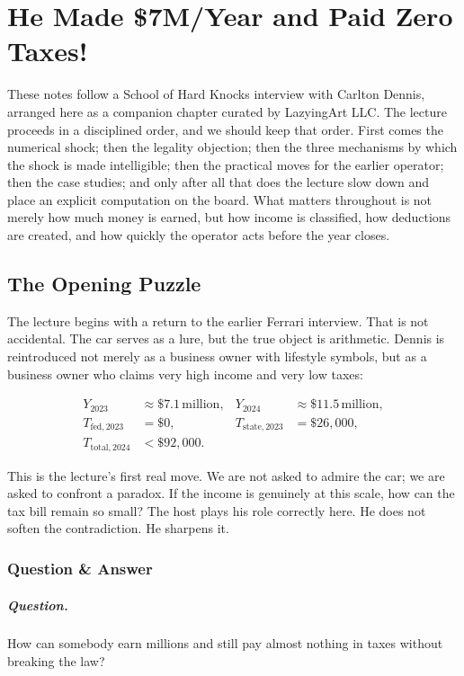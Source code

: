 \chapter{He Made \$7M/Year and Paid Zero Taxes!}

These notes follow a School of Hard Knocks interview with Carlton Dennis, arranged here as a companion chapter curated by LazyingArt LLC. The lecture proceeds in a disciplined order, and we should keep that order. First comes the numerical shock; then the legality objection; then the three mechanisms by which the shock is made intelligible; then the practical moves for the earlier operator; then the case studies; and only after all that does the lecture slow down and place an explicit computation on the board. What matters throughout is not merely how much money is earned, but how income is classified, how deductions are created, and how quickly the operator acts before the year closes.

\section{The Opening Puzzle}

The lecture begins with a return to the earlier Ferrari interview. That is not accidental. The car serves as a lure, but the true object is arithmetic. Dennis is reintroduced not merely as a business owner with lifestyle symbols, but as a business owner who claims very high income and very low taxes:

\begin{align}
Y_{2023} &\approx \$7.1\,\text{million}, &
Y_{2024} &\approx \$11.5\,\text{million}, \\
T_{\mathrm{fed},2023} &= \$0, &
T_{\mathrm{state},2023} &= \$26{,}000, \\
T_{\mathrm{total},2024} &< \$92{,}000. &&
\end{align}

This is the lecture's first real move. We are not asked to admire the car; we are asked to confront a paradox. If the income is genuinely at this scale, how can the tax bill remain so small? The host plays his role correctly here. He does not soften the contradiction. He sharpens it.

\subsection{Question \& Answer}

\paragraph{Question.} How can somebody earn millions and still pay almost nothing in taxes without breaking the law?

